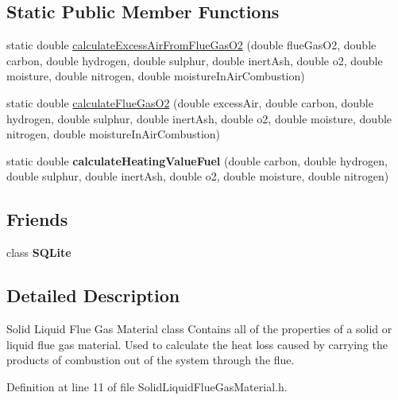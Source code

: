 \subsection*{Static Public Member Functions}
\begin{DoxyCompactItemize}
\item 
static double \hyperlink{class_solid_liquid_flue_gas_material_a57ddf04184687f8efe031986b591ad6b}{calculate\+Excess\+Air\+From\+Flue\+Gas\+O2} (double flue\+Gas\+O2, double carbon, double hydrogen, double sulphur, double inert\+Ash, double o2, double moisture, double nitrogen, double moisture\+In\+Air\+Combustion)
\item 
static double \hyperlink{class_solid_liquid_flue_gas_material_a39dbc6f412ce2ec739ed8107fbdc68a7}{calculate\+Flue\+Gas\+O2} (double excess\+Air, double carbon, double hydrogen, double sulphur, double inert\+Ash, double o2, double moisture, double nitrogen, double moisture\+In\+Air\+Combustion)
\item 
\mbox{\label{class_solid_liquid_flue_gas_material_aa6f11cd466965e30af4f8c30d7a5f402}} 
static double {\bfseries calculate\+Heating\+Value\+Fuel} (double carbon, double hydrogen, double sulphur, double inert\+Ash, double o2, double moisture, double nitrogen)
\end{DoxyCompactItemize}
\subsection*{Friends}
\begin{DoxyCompactItemize}
\item 
\mbox{\label{class_solid_liquid_flue_gas_material_ac7d22f3ca36435f73d55df60dc799e14}} 
class {\bfseries S\+Q\+Lite}
\end{DoxyCompactItemize}


\subsection{Detailed Description}
Solid Liquid Flue Gas Material class Contains all of the properties of a solid or liquid flue gas material. Used to calculate the heat loss caused by carrying the products of combustion out of the system through the flue. 

Definition at line 11 of file Solid\+Liquid\+Flue\+Gas\+Material.\+h.



